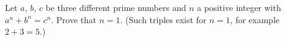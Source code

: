 Let $a$, $b$, $c$ be three different prime numbers and $n$ a positive integer with $a^n+b^n=c^n$. Prove that $n=1$. (Such triples exist for $n=1$, for example $2+3=5$.)
